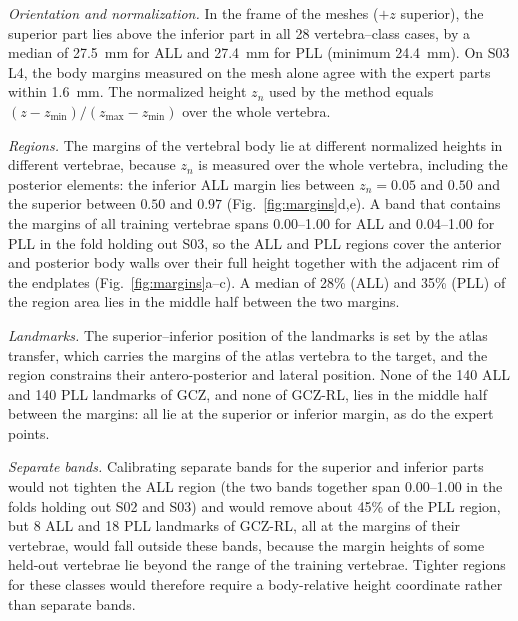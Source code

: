 \documentclass[10pt,a4paper]{article}
\begin{document}
\emph{Orientation and normalization.} In the frame of the meshes ($+z$ superior), the superior part lies above the inferior part in all 28 vertebra--class cases, by a median of 27.5~mm for ALL and 27.4~mm for PLL (minimum 24.4~mm). On S03 L4, the body margins measured on the mesh alone agree with the expert parts within 1.6~mm. The normalized height $z_n$ used by the method equals $(z-z_{\min})/(z_{\max}-z_{\min})$ over the whole vertebra.

\emph{Regions.} The margins of the vertebral body lie at different normalized heights in different vertebrae, because $z_n$ is measured over the whole vertebra, including the posterior elements: the inferior ALL margin lies between $z_n=0.05$ and $0.50$ and the superior between $0.50$ and $0.97$ (Fig.~\ref{fig:margins}d,e). A band that contains the margins of all training vertebrae spans 0.00--1.00 for ALL and 0.04--1.00 for PLL in the fold holding out S03, so the ALL and PLL regions cover the anterior and posterior body walls over their full height together with the adjacent rim of the endplates (Fig.~\ref{fig:margins}a--c). A median of 28\% (ALL) and 35\% (PLL) of the region area lies in the middle half between the two margins.

\emph{Landmarks.} The superior--inferior position of the landmarks is set by the atlas transfer, which carries the margins of the atlas vertebra to the target, and the region constrains their antero-posterior and lateral position. None of the 140 ALL and 140 PLL landmarks of GCZ, and none of GCZ-RL, lies in the middle half between the margins: all lie at the superior or inferior margin, as do the expert points.

\emph{Separate bands.} Calibrating separate bands for the superior and inferior parts would not tighten the ALL region (the two bands together span 0.00--1.00 in the folds holding out S02 and S03) and would remove about 45\% of the PLL region, but 8 ALL and 18 PLL landmarks of GCZ-RL, all at the margins of their vertebrae, would fall outside these bands, because the margin heights of some held-out vertebrae lie beyond the range of the training vertebrae. Tighter regions for these classes would therefore require a body-relative height coordinate rather than separate bands.
\end{document}
